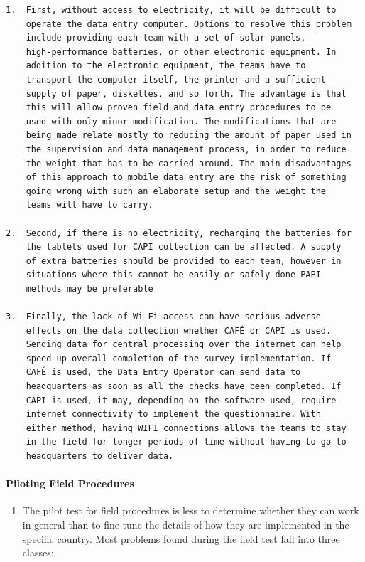 \documentclass[
]{article}
\providecommand{\tightlist}{%
  \setlength{\itemsep}{0pt}\setlength{\parskip}{0pt}}
\begin{document}
\begin{verbatim}
1.  First, without access to electricity, it will be difficult to
    operate the data entry computer. Options to resolve this problem
    include providing each team with a set of solar panels,
    high-performance batteries, or other electronic equipment. In
    addition to the electronic equipment, the teams have to
    transport the computer itself, the printer and a sufficient
    supply of paper, diskettes, and so forth. The advantage is that
    this will allow proven field and data entry procedures to be
    used with only minor modification. The modifications that are
    being made relate mostly to reducing the amount of paper used in
    the supervision and data management process, in order to reduce
    the weight that has to be carried around. The main disadvantages
    of this approach to mobile data entry are the risk of something
    going wrong with such an elaborate setup and the weight the
    teams will have to carry.

2.  Second, if there is no electricity, recharging the batteries for
    the tablets used for CAPI collection can be affected. A supply
    of extra batteries should be provided to each team, however in
    situations where this cannot be easily or safely done PAPI
    methods may be preferable

3.  Finally, the lack of Wi-Fi access can have serious adverse
    effects on the data collection whether CAFÉ or CAPI is used.
    Sending data for central processing over the internet can help
    speed up overall completion of the survey implementation. If
    CAFÉ is used, the Data Entry Operator can send data to
    headquarters as soon as all the checks have been completed. If
    CAPI is used, it may, depending on the software used, require
    internet connectivity to implement the questionnaire. With
    either method, having WIFI connections allows the teams to stay
    in the field for longer periods of time without having to go to
    headquarters to deliver data.
\end{verbatim}

\hypertarget{piloting-field-procedures-1}{%
\paragraph{Piloting Field Procedures}\label{piloting-field-procedures-1}}

\begin{enumerate}
\def\labelenumi{\arabic{enumi}.}
\setcounter{enumi}{331}
\tightlist
\item
  The pilot test for field procedures is less to determine whether
  they can work in general than to fine tune the details of how they
  are implemented in the specific country. Most problems found during
  the field test fall into three classes:
\end{enumerate}
\end{document}
